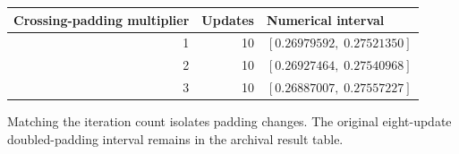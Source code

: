 \begin{center}
\begin{tabular}{@{}rrl@{}}\toprule
Crossing-padding multiplier & Updates & Numerical interval\\\midrule
1 & 10 & $[0.26979592,\;0.27521350]$ \\
2 & 10 & $[0.26927464,\;0.27540968]$ \\
3 & 10 & $[0.26887007,\;0.27557227]$ \\
\bottomrule
\end{tabular}
\end{center}
Matching the iteration count isolates padding changes. The original eight-update doubled-padding interval remains in the archival result table.
